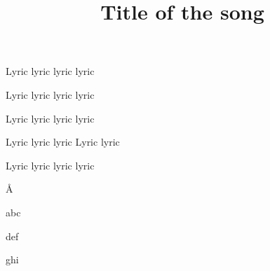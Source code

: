 

\title{Title of the song}

Lyric lyric lyric  lyric

Lyric lyric lyric  lyric

Lyric lyric lyric  lyric

Lyric lyric lyric Lyric lyric

Lyric lyric lyric  lyric

\hbox{Å}
\the{}

\def\pilcrow{\space x\space}
\let\par\pilcrow
 
 abc
 
 def
 
 ghi
\bye


